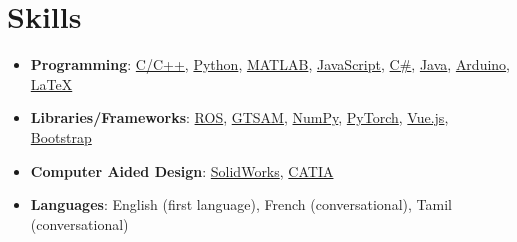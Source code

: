 \documentclass[letterpaper,11pt]{article}
\newcommand{\resumeSkillItemHeading}[2]{
  \item\small{
    \textbf{#1}{: #2 \vspace{-2pt}}
  }
}
\newcommand{\resumeSubHeadingListEnd}{\end{itemize}}
\newcommand{\resumeItemListStart}{\begin{itemize}}
\newcommand{\resumeItemListEnd}{\end{itemize}\vspace{-5pt}}
\begin{document}




\section{Skills}
\resumeItemListStart

\resumeSkillItemHeading
{Programming}
{\href{https://www.cplusplus.com/}{C/C++}, \href{https://www.python.org/}{Python}, \href{https://www.mathworks.com/products/matlab.html}{MATLAB}, \href{https://www.javascript.com/}{JavaScript}, \href{https://docs.microsoft.com/en-us/dotnet/csharp/}{C\#}, \href{https://www.java.com/}{Java}, \href{https://www.arduino.cc/}{Arduino}, \href{https://www.latex-project.org/}{\LaTeX}}

\resumeSkillItemHeading
{Libraries/Frameworks}
{\href{https://www.ros.org/}{ROS}, \href{https://gtsam.org/}{GTSAM}, \href{https://numpy.org/}{NumPy}, \href{https://pytorch.org/}{PyTorch}, \href{https://vuejs.org/}{Vue.js}, \href{https://getbootstrap.com/}{Bootstrap}}

\resumeSkillItemHeading
{Computer Aided Design}
{\href{https://www.solidworks.com/}{SolidWorks}, \href{https://www.3ds.com/products-services/catia/}{CATIA}}


\resumeSkillItemHeading
{Languages}
{English (first language), French (conversational), Tamil (conversational)}

\resumeItemListEnd

\end{document}
